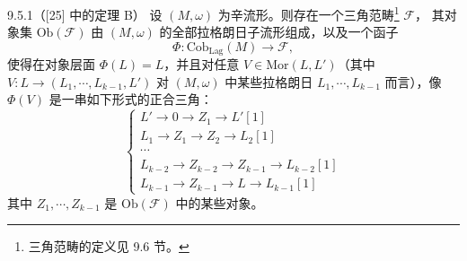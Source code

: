 \begin{wthm}{9.5.1}（[25] 中的定理 B）
设 $(M,\omega)$ 为辛流形。则存在一个三角范畴\footnote{三角范畴的定义见 9.6 节。} $\mathcal{F}$，
其对象集 $\mathrm{Ob}(\mathcal{F})$ 由 $(M,\omega)$ 的全部拉格朗日子流形组成，以及一个函子
\[
  \Phi:\mathrm{Cob}_{\mathrm{Lag}}(M)\to\mathcal{F},
\]
使得在对象层面 $\Phi(L)=L$，并且对任意 $V\in\mathrm{Mor}(L,L')$（其中
$V:L\to(L_1,\cdots,L_{k-1},L')$ 对 $(M,\omega)$ 中某些拉格朗日
$L_1,\cdots,L_{k-1}$ 而言），像 $\Phi(V)$ 是一串如下形式的正合三角：
\[
  \left\lbrace
  \begin{array}{l}
    L'\to0\to Z_1\to L'[1]\\
    L_1\to Z_1\to Z_2\to L_2[1]\\
    \cdots\\
    L_{k-2}\to Z_{k-2}\to Z_{k-1}\to L_{k-2}[1]\\
    L_{k-1}\to Z_{k-1}\to L\to L_{k-1}[1]
  \end{array}
  \right.
\]
其中 $Z_1,\cdots,Z_{k-1}$ 是 $\mathrm{Ob}(\mathcal{F})$ 中的某些对象。
\end{wthm}
